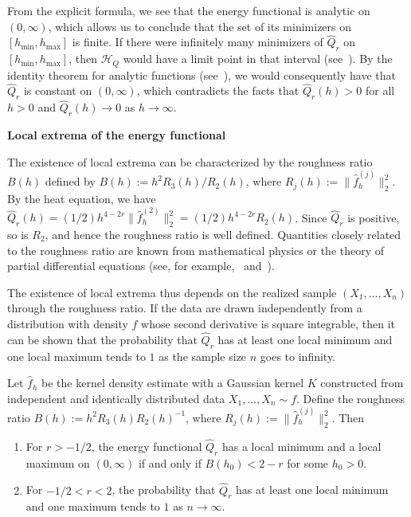From the explicit formula, we see that the energy functional is analytic on $(0,\infty)$, which allows us to conclude that the set of its minimizers on $[h_{\min},h_{\max}]$ is finite. If there were infinitely many minimizers of $\hat{Q}_r$ on $[h_{\min},h_{\max}]$, then $\mathcal{H}_Q$ would have a limit point in that interval (see~\cite[Theorem~2.37]{rudin_real_1987}). By the identity theorem for analytic functions (see~\cite[Corollary~1.2.7]{Krantz2012-yf}), we would consequently have that $\hat{Q}_r$ is constant on $(0,\infty)$, which contradicts the facts that $\hat{Q}_r(h)>0$ for all $h>0$ and $\hat{Q}_r(h)\to0$ as $h\to\infty$.

\textbf{Local extrema of the energy functional}

The existence of local extrema can be characterized by the roughness ratio $B(h)$ defined by $B(h):=h^2R_3(h)/R_2(h)$, where $R_j(h):=\|\hat{f}_h^{(j)}\|_2^2$. By the heat equation, we have $\hat{Q}_r(h)=(1/2)h^{4-2r}\|\hat{f}_h^{(2)}\|_2^2=(1/2)h^{4-2r}R_2(h)$. Since $\hat{Q}_r$ is positive, so is $R_2$, and hence the roughness ratio is well defined. Quantities closely related to the roughness ratio are known from mathematical physics or the theory of partial differential equations (see, for example,~\cite[Equation~(8)]{coleman-smith_classification_2013} and~\cite[Equation~(2.14)]{ignatova_strong_2013}).

The existence of local extrema thus depends on the realized sample $(X_1,\dots,X_n)$ through the roughness ratio. If the data are drawn independently from a distribution with density $f$ whose second derivative is square integrable, then it can be shown that the probability that $\hat{Q}_r$ has at least one local minimum and one local maximum tends to $1$ as the sample size $n$ goes to infinity.

\begin{Prop}\label{prop:energy_functional_local_extrema}
    Let $\hat{f}_{h}$ be the kernel density estimate with a Gaussian kernel $K$ constructed from independent and identically distributed data $X_1,\dots,X_n\sim f$. Define the roughness ratio $B(h):=h^2R_3(h)R_2(h)^{-1}$, where $R_j(h):=\|\hat{f}_{h}^{(j)}\|_2^2$. Then
    \begin{enumerate}
        \item[(a)] For $r>-1/2$, the energy functional $\hat{Q}_r$ has a local minimum and a local maximum on $(0,\infty)$ if and only if $B(h_0)<2-r$ for some $h_0>0$.
        \item[(b)] For $-1/2<r<2$, the probability that $\hat{Q}_r$ has at least one local minimum and one maximum tends to $1$ as $n\to\infty$.
    \end{enumerate}
\end{Prop}

